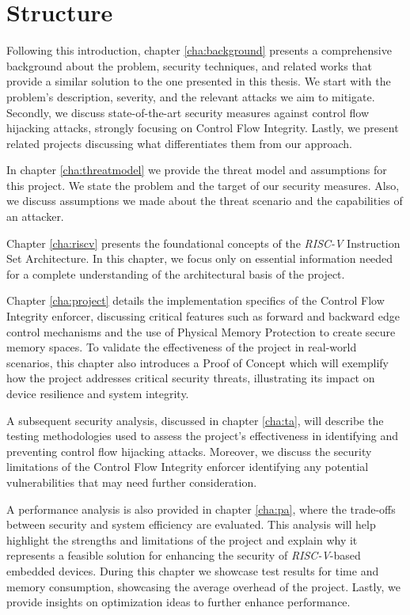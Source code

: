 \section{Structure}
\label{sec:intro_structure}

Following this introduction, chapter \ref{cha:background} presents a
comprehensive background about the problem, security techniques, and related
works that provide a similar solution to the one presented in this thesis. We start
with the problem's description, severity, and the relevant attacks we aim to mitigate.
Secondly, we discuss state-of-the-art security measures against control flow hijacking
attacks, strongly focusing on Control Flow Integrity. Lastly, we present related
projects discussing what differentiates them from our approach.

In chapter \ref{cha:threatmodel} we provide the threat model and assumptions for
this project. We state the problem and the target of our security measures. Also,
we discuss assumptions we made about the threat scenario and the capabilities of
an attacker.

Chapter \ref{cha:riscv} presents the foundational concepts of the \textit{RISC-V}
Instruction Set Architecture. In this chapter, we focus only on essential
information needed for a complete understanding of the architectural basis of
the project.

Chapter \ref{cha:project} details the implementation specifics of the Control
Flow Integrity enforcer, discussing critical features such as forward and backward
edge control mechanisms and the use of Physical Memory Protection to create secure
memory spaces. To validate the effectiveness of the project in real-world
scenarios, this chapter also introduces a Proof of Concept which will exemplify how
the project addresses critical security threats, illustrating its impact on
device resilience and system integrity.

A subsequent security analysis, discussed in chapter \ref{cha:ta}, will describe
the testing methodologies used to assess the project's effectiveness in
identifying and preventing control flow hijacking attacks. Moreover, we discuss
the security limitations of the Control Flow Integrity enforcer identifying any
potential vulnerabilities that may need further consideration.

A performance analysis is also provided in chapter \ref{cha:pa}, where the trade-offs
between security and system efficiency are evaluated. This analysis will help
highlight the strengths and limitations of the project and explain why it
represents a feasible solution for enhancing the security of \textit{RISC-V}-based
embedded devices. During this chapter we showcase test results for time and
memory consumption, showcasing the average overhead of the project. Lastly, we provide
insights on optimization ideas to further enhance performance.

